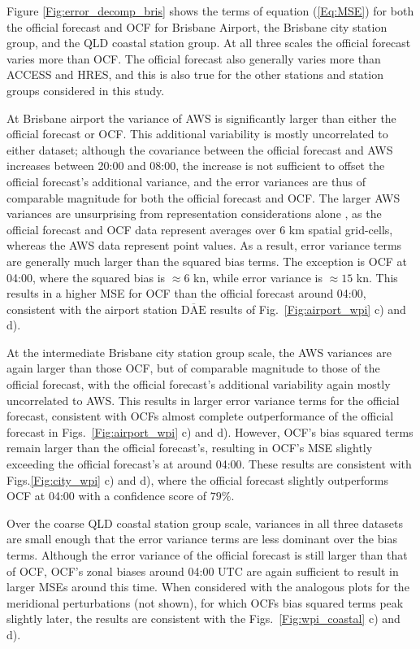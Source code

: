 \documentclass[twocol]{ametsoc}
\begin{document}
Figure \ref{Fig:error_decomp_bris} shows the terms of equation (\ref{Eq:MSE}) for both the official forecast and OCF for Brisbane Airport, the Brisbane city station group, and the QLD coastal station group. At all three scales the official forecast varies more than OCF. The official forecast also generally varies more than ACCESS and HRES, and this is also true for the other stations and station groups considered in this study. 

At Brisbane airport the variance of AWS is significantly larger than either the official forecast or OCF. This additional variability is mostly uncorrelated to either dataset; although the covariance between the official forecast and AWS increases between 20:00 and 08:00, the increase is not sufficient to offset the official forecast's additional variance, and the error variances are thus of comparable magnitude for both the official forecast and OCF. The larger AWS variances are unsurprising from representation considerations alone \citep[e.g.][]{zaron06}, as the official forecast and OCF data represent averages over 6 km spatial grid-cells, whereas the AWS data represent point values. As a result, error variance terms are generally much larger than the squared bias terms. The exception is OCF at 04:00, where the squared bias is $\approx 6$ kn, while error variance is $\approx 15$ kn. This results in a higher MSE for OCF than the official forecast around 04:00, consistent with the airport station $\overline{\text{DAE}}$ results of Fig.~\ref{Fig:airport_wpi} c) and d).

At the intermediate Brisbane city station group scale, the AWS variances are again larger than those OCF, but of comparable magnitude to those of the official forecast, with the official forecast's additional variability again mostly uncorrelated to AWS. This results in larger error variance terms for the official forecast, consistent with OCFs almost complete outperformance of the official forecast in Figs.~\ref{Fig:airport_wpi} c) and d). However, OCF's bias squared terms remain larger than the official forecast's, resulting in OCF's MSE slightly exceeding the official forecast's at around 04:00. These results are consistent with Figs.\ref{Fig:city_wpi} c) and d), where the official forecast slightly outperforms OCF at 04:00 with a confidence score of $79\%$.  

Over the coarse QLD coastal station group scale, variances in all three datasets are small enough that the error variance terms are less dominant over the bias terms. Although the error variance of the official forecast is still larger than that of OCF, OCF's zonal biases around 04:00 UTC are again sufficient to result in larger MSEs around this time. When considered with the analogous plots for the meridional perturbations (not shown), for which OCFs bias squared terms peak slightly later, the results are consistent with the Figs.~\ref{Fig:wpi_coastal} c) and d). 
\end{document}
